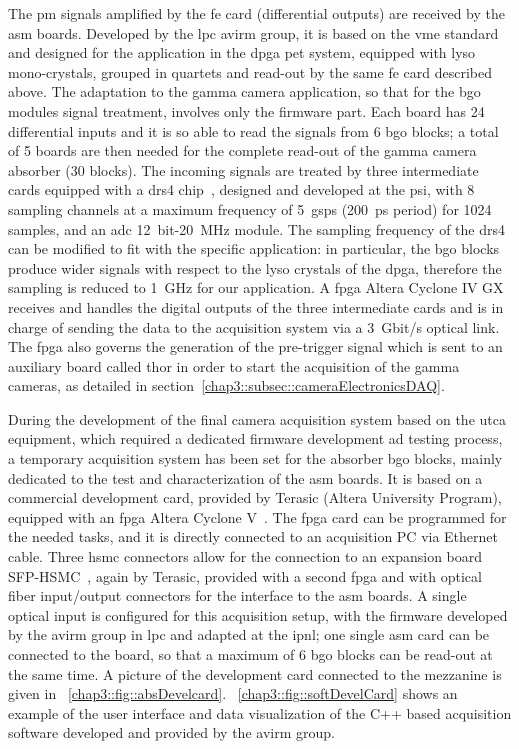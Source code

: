 The \gls{pm} signals amplified by the \gls{fe} card (differential outputs) are received by the \gls{asm} boards. Developed by the \gls{lpc} \gls{avirm} group, it is based on the \gls{vme} standard and designed for the application in the \gls{dpga} \gls{pet} system, equipped with \gls{lyso} mono-crystals, grouped in quartets and read-out by the same \gls{fe} card described above. The adaptation to the gamma camera application, so that for the \gls{bgo} modules signal treatment, involves only the firmware part. Each board has 24 differential inputs and it is so able to read the signals from 6 \gls{bgo} blocks; a total of 5 boards are then needed for the complete read-out of the gamma camera absorber (30 blocks). The incoming signals are treated by three intermediate cards  equipped with a \gls{drs}4 chip~\parencite{Ritt2009}, designed and developed at the \gls{psi}, with 8 sampling channels at a maximum frequency of 5~\gls{gsps} (200~ps period) for 1024 samples, and an \gls{adc} 12~bit-20~MHz module. The sampling frequency of the \gls{drs}4 can be modified to fit with the specific application: in particular, the \gls{bgo} blocks produce wider signals with respect to the \gls{lyso} crystals of the \gls{dpga}, therefore the sampling is reduced to 1~GHz for our application. A \gls{fpga} Altera Cyclone IV GX~\parencite{Altera2016} receives and handles the digital outputs of the three intermediate cards and is in charge of sending the data to the acquisition system via a 3~Gbit/s optical link. The \gls{fpga} also governs the generation of the pre-trigger signal which is sent to an auxiliary board called \gls{thor} in order to start the acquisition of the gamma cameras, as detailed in section~\ref{chap3::subsec::cameraElectronicsDAQ}.

During the development of the final camera acquisition system based on the \gls{utca} equipment, which required a dedicated firmware development ad testing process, a temporary acquisition system has been set for the absorber \gls{bgo} blocks, mainly dedicated to the test and characterization of the \gls{asm} boards. It is based on a commercial development card, provided by Terasic (Altera University Program), equipped with an \gls{fpga} Altera Cyclone V~\parencite{Terasic2015}. The \gls{fpga} card can be programmed for the needed tasks, and it is directly connected to an acquisition PC via Ethernet cable. Three \gls{hsmc} connectors allow for the connection to an expansion board SFP-HSMC~\parencite{Terasic2009}, again by Terasic, provided with a second \gls{fpga} and with optical fiber input/output connectors for the interface to the \gls{asm} boards. A single optical input is configured for this acquisition setup, with the firmware developed by the \gls{avirm} group in \gls{lpc} and adapted at the \gls{ipnl}; one single \gls{asm} card can be connected to the board, so that a maximum of 6 \gls{bgo} blocks can be read-out at the same time. A picture of the development card connected to the mezzanine is given in \figurename~\ref{chap3::fig::absDevelcard}. \figurename~\ref{chap3::fig::softDevelCard} shows an example of the user interface and data visualization of the C++ based acquisition software developed and provided by the \gls{avirm} group.   

